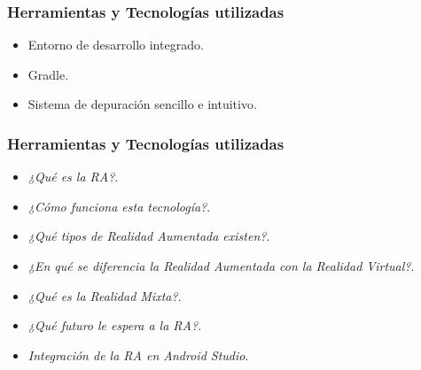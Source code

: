 \begin{frame}
	\frametitle{Herramientas y Tecnologías utilizadas}
		\begin{itemize}
			\item Entorno de desarrollo integrado.
			\item Gradle.
			\item Sistema de depuración sencillo e intuitivo.
		\end{itemize}
	\endblock{}
\end{frame}

\begin{frame}
	\frametitle{Herramientas y Tecnologías utilizadas}
		\begin{itemize}
			\item {\it ¿Qué es la RA?}.
			\item {\it ¿Cómo funciona esta tecnología?}.
			\item {\it ¿Qué tipos de Realidad Aumentada existen?}.
			\item {\it ¿En qué se diferencia la Realidad Aumentada con la Realidad Virtual?}.
			\item {\it ¿Qué es la Realidad Mixta?}.
			\item {\it ¿Qué futuro le espera a la RA?}.
			\item {\it Integración de la RA en Android Studio}.
		\end{itemize}
	\endblock{}
\end{frame}


